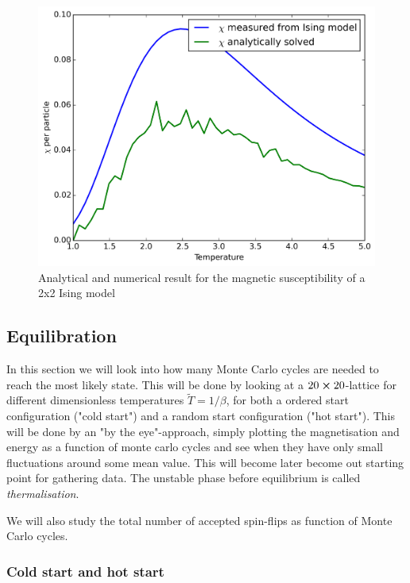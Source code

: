 \documentclass[11pt,a4paper,english]{article}
\numberwithin{equation}{section}
\newcommand{\figurewidth}{.85\textwidth}
\begin{document}
\begin{figure}
\centering
\includegraphics[width=\figurewidth]{pics/pics4report/achi.png}
\caption{Analytical and numerical result for the magnetic susceptibility
of a 2x2 Ising model}
\label{fig:achi}
\end{figure}



\subsection{Equilibration}
In this section we will look into how many Monte Carlo cycles are needed 
to reach the most likely state. This will be done by looking at a 
$20 \cross 20$-lattice for different dimensionless temperatures 
$\tilde{T}=1/\beta$, for both a ordered start configuration ("cold start") 
and a random start configuration ("hot start"). 
This will be done by an "by the eye"-approach, simply plotting the 
magnetisation and energy as a function of monte carlo cycles and see 
when they have only small fluctuations around some mean value. This will 
become later become out starting point for gathering data. The unstable 
phase before equilibrium is called \emph{thermalisation}.

We will also study the total number of accepted spin-flips as function of 
Monte Carlo cycles.



\subsubsection{Cold start and hot start}
\end{document}
